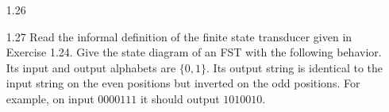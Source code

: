 \begin{enumerate}

    \item [1.26]
    \item [1.27]
          Read the informal definition of the finite state transducer given in Exercise 1.24. Give the state diagram of an FST with the following behavior. Its input and output alphabets are $\{0,1\}$. Its output string is identical to the input string on the even positions but inverted on the odd positions. For example, on input $0000111$ it should output $1010010$.
\end{enumerate}
